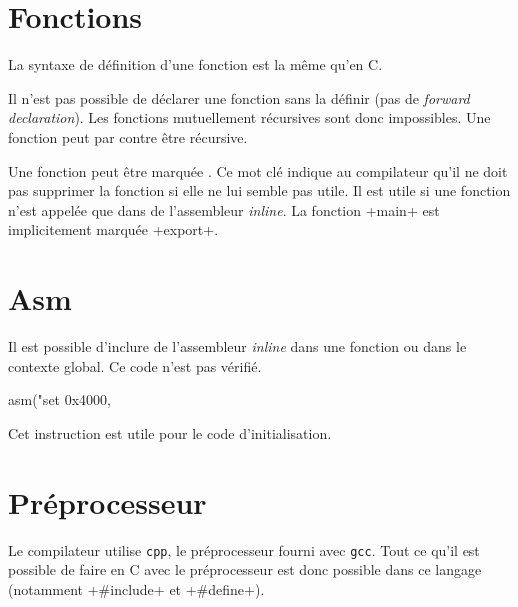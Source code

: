 \documentclass{article}
\begin{document}
  \section{Fonctions}
    La syntaxe de définition d'une fonction est la même qu'en C.

    Il n'est pas possible de déclarer une fonction sans la définir (pas de
    \emph{forward declaration}). Les fonctions mutuellement récursives sont donc
    impossibles. Une fonction peut par contre être récursive.

    Une fonction peut être marquée . Ce mot clé indique au
    compilateur qu'il ne doit pas supprimer la fonction si elle ne lui semble
    pas utile. Il est utile si une fonction n'est appelée que dans de
    l'assembleur \emph{inline}. La fonction \imoc+main+ est implicitement
    marquée \imoc+export+.

  \section{Asm}
    Il est possible d'inclure de l'assembleur \emph{inline} dans une fonction ou
    dans le contexte global. Ce code n'est pas vérifié.

    \begin{moc}
asm("set 0x4000, %
    \end{moc}

    Cet instruction est utile pour le code d'initialisation.

  \section{Préprocesseur}
    Le compilateur utilise \verb+cpp+, le préprocesseur fourni avec \verb+gcc+.
    Tout ce qu'il est possible de faire en C avec le préprocesseur est donc
    possible dans ce langage (notamment \imoc+#include+ et \imoc+#define+).
\end{document}
